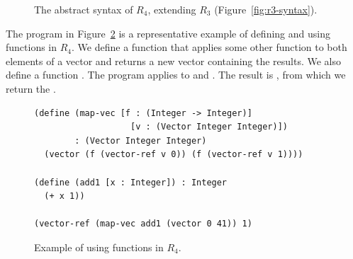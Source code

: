 \documentclass[11pt]{book}
\newcommand{\gray}[1]{{\color{gray} #1}}
\begin{document}
\begin{figure}[tp]
\centering
\fbox{
  \begin{minipage}{0.96\textwidth}
    \small
\[
\begin{array}{lcl}
\Exp &::=& \gray{ \INT{\Int} \mid \READ{} \mid \NEG{\Exp} } \\
     &\mid& \gray{ \ADD{\Exp}{\Exp} 
      \mid \BINOP{\code{'-}}{\Exp}{\Exp} } \\
     &\mid& \gray{ \VAR{\Var} \mid \LET{\Var}{\Exp}{\Exp} } \\
     &\mid& \gray{ \BOOL{\itm{bool}} 
      \mid \AND{\Exp}{\Exp} }\\
     &\mid& \gray{ \OR{\Exp}{\Exp}
      \mid \NOT{\Exp} } \\
     &\mid& \gray{ \BINOP{\itm{cmp}}{\Exp}{\Exp}
      \mid \IF{\Exp}{\Exp}{\Exp} } \\
     &\mid& \gray{ \VECTOR{\Exp} } \\
     &\mid& \gray{ \VECREF{\Exp}{\INT{\Int}} }\\
     &\mid& \gray{ \VECSET{\Exp}{\INT{\Int}}{\Exp}} \\
     &\mid& \gray{ \VOID{} \mid \LP\key{HasType}~\Exp~\Type \RP } 
     \mid \APPLY{\Exp}{\Exp\ldots}\\
 \Def &::=& \FUNDEF{\Var}{([\Var \code{:} \Type]\ldots)}{\Type}{\code{'()}}{\Exp}\\
  R_4 &::=& \PROGRAMDEFSEXP{\code{'()}}{(\Def\ldots)}{\Exp}
\end{array}
\]
\end{minipage}
}
\caption{The abstract syntax of $R_4$, extending $R_3$ (Figure~\ref{fig:r3-syntax}).}
\label{fig:r4-syntax}
\end{figure}


The program in Figure~\ref{fig:r4-function-example} is a
representative example of defining and using functions in $R_4$.  We
define a function  that applies some other function
 to both elements of a vector and returns a new
vector containing the results. We also define a function .
The program applies
 to  and .  The result is
, from which we return the .

\begin{figure}[tbp]
\begin{lstlisting}
(define (map-vec [f : (Integer -> Integer)]
                   [v : (Vector Integer Integer)])
        : (Vector Integer Integer)
  (vector (f (vector-ref v 0)) (f (vector-ref v 1))))

(define (add1 [x : Integer]) : Integer
  (+ x 1))

(vector-ref (map-vec add1 (vector 0 41)) 1)
\end{lstlisting}
\caption{Example of using functions in $R_4$.}
\label{fig:r4-function-example}
\end{figure}
\end{document}
